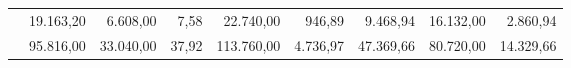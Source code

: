\begin{table}[htb]
\begin{tabular}{@{}crrrrrrrr@{}}
                     & 19.163,20                                                    & 6.608,00                                             & 7,58                           & 22.740,00                           & 946,89                              & 9.468,94                                                   & \cellcolor[HTML]{67FD9A}16.132,00                                                          & 2.860,94              \\
                     & 95.816,00                                                    & 33.040,00                                            & 37,92                          & 113.760,00                          & 4.736,97                            & 47.369,66                                                  & 80.720,00                                                          & 14.329,66             \\ \bottomrule 
\end{tabular}
\end{table}